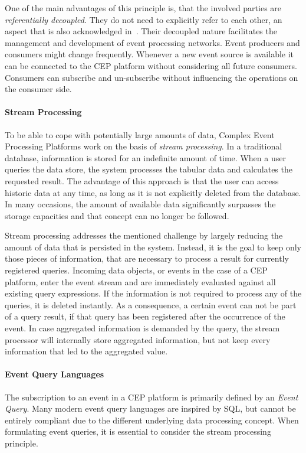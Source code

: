 One of the main advantages of this principle is, that the involved parties are \textit{referentially decoupled}. They do not need to explicitly refer to each other, an aspect that is also acknowledged in~\cite{evtprocessing}.
Their decoupled nature facilitates the management and development of event processing networks. Event producers and consumers might change frequently.
Whenever a new event source is available it can be connected to the CEP platform without considering all future consumers. Consumers can subscribe and un-subscribe without influencing the operations on the consumer side.


\paragraph{Stream Processing}
To be able to cope with potentially large amounts of data, Complex Event Processing Platforms work on the basis of \textit{stream processing}.
In a traditional database, information is stored for an indefinite amount of time. When a user queries the data store, the system processes the tabular data and calculates the requested result. 
The advantage of this approach is that the user can access historic data at any time, as long as it is not explicitly deleted from the database.
In many occasions, the amount of available data significantly surpasses the storage capacities and that concept can no longer be followed.

Stream processing addresses the mentioned challenge by largely reducing the amount of data that is persisted in the system. Instead, it is the goal to keep only those pieces of information, that are necessary to process a result for currently registered queries.
Incoming data objects, or events in the case of a CEP platform, enter the event stream and are immediately evaluated against all existing query expressions. If the information is not required to process any of the queries, it is deleted instantly.
As a consequence, a certain event can not be part of a query result, if that query has been registered after the occurrence of the event.
In case aggregated information is demanded by the query, the stream processor will internally store aggregated information, but not keep every information that led to the aggregated value.~\cite{streamprocessing} 


\paragraph{Event Query Languages}
The subscription to an event in a CEP platform is primarily defined by an \textit{Event Query}.
Many modern event query languages are inspired by \acs{SQL}, but cannot be entirely compliant due to the different underlying data processing concept.
When formulating event queries, it is essential to consider the stream processing principle.

